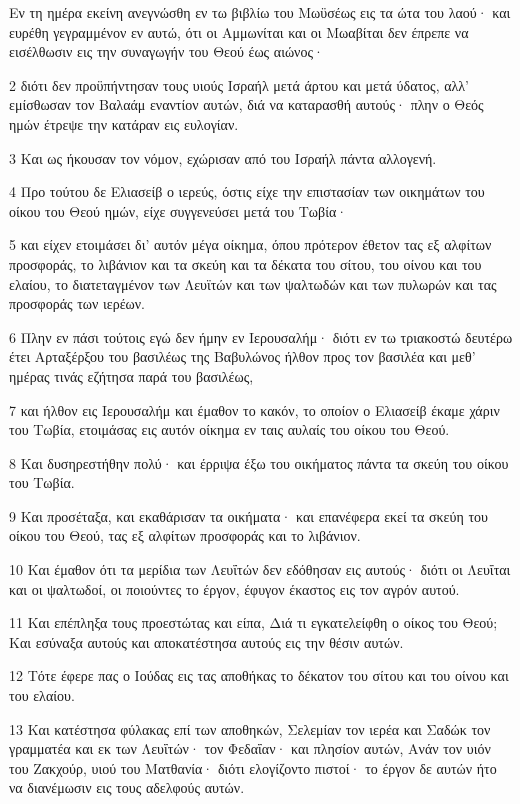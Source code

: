 \par Εν τη ημέρα εκείνη ανεγνώσθη εν τω βιβλίω του Μωϋσέως εις τα ώτα του λαού· και ευρέθη γεγραμμένον εν αυτώ, ότι οι Αμμωνίται και οι Μωαβίται δεν έπρεπε να εισέλθωσιν εις την συναγωγήν του Θεού έως αιώνος·
\par 2 διότι δεν προϋπήντησαν τους υιούς Ισραήλ μετά άρτου και μετά ύδατος, αλλ' εμίσθωσαν τον Βαλαάμ εναντίον αυτών, διά να καταρασθή αυτούς· πλην ο Θεός ημών έτρεψε την κατάραν εις ευλογίαν.
\par 3 Και ως ήκουσαν τον νόμον, εχώρισαν από του Ισραήλ πάντα αλλογενή.
\par 4 Προ τούτου δε Ελιασείβ ο ιερεύς, όστις είχε την επιστασίαν των οικημάτων του οίκου του Θεού ημών, είχε συγγενεύσει μετά του Τωβία·
\par 5 και είχεν ετοιμάσει δι' αυτόν μέγα οίκημα, όπου πρότερον έθετον τας εξ αλφίτων προσφοράς, το λιβάνιον και τα σκεύη και τα δέκατα του σίτου, του οίνου και του ελαίου, το διατεταγμένον των Λευϊτών και των ψαλτωδών και των πυλωρών και τας προσφοράς των ιερέων.
\par 6 Πλην εν πάσι τούτοις εγώ δεν ήμην εν Ιερουσαλήμ· διότι εν τω τριακοστώ δευτέρω έτει Αρταξέρξου του βασιλέως της Βαβυλώνος ήλθον προς τον βασιλέα και μεθ' ημέρας τινάς εζήτησα παρά του βασιλέως,
\par 7 και ήλθον εις Ιερουσαλήμ και έμαθον το κακόν, το οποίον ο Ελιασείβ έκαμε χάριν του Τωβία, ετοιμάσας εις αυτόν οίκημα εν ταις αυλαίς του οίκου του Θεού.
\par 8 Και δυσηρεστήθην πολύ· και έρριψα έξω του οικήματος πάντα τα σκεύη του οίκου του Τωβία.
\par 9 Και προσέταξα, και εκαθάρισαν τα οικήματα· και επανέφερα εκεί τα σκεύη του οίκου του Θεού, τας εξ αλφίτων προσφοράς και το λιβάνιον.
\par 10 Και έμαθον ότι τα μερίδια των Λευΐτών δεν εδόθησαν εις αυτούς· διότι οι Λευΐται και οι ψαλτωδοί, οι ποιούντες το έργον, έφυγον έκαστος εις τον αγρόν αυτού.
\par 11 Και επέπληξα τους προεστώτας και είπα, Διά τι εγκατελείφθη ο οίκος του Θεού; Και εσύναξα αυτούς και αποκατέστησα αυτούς εις την θέσιν αυτών.
\par 12 Τότε έφερε πας ο Ιούδας εις τας αποθήκας το δέκατον του σίτου και του οίνου και του ελαίου.
\par 13 Και κατέστησα φύλακας επί των αποθηκών, Σελεμίαν τον ιερέα και Σαδώκ τον γραμματέα και εκ των Λευΐτών· τον Φεδαΐαν· και πλησίον αυτών, Ανάν τον υιόν του Ζακχούρ, υιού του Ματθανία· διότι ελογίζοντο πιστοί· το έργον δε αυτών ήτο να διανέμωσιν εις τους αδελφούς αυτών.
